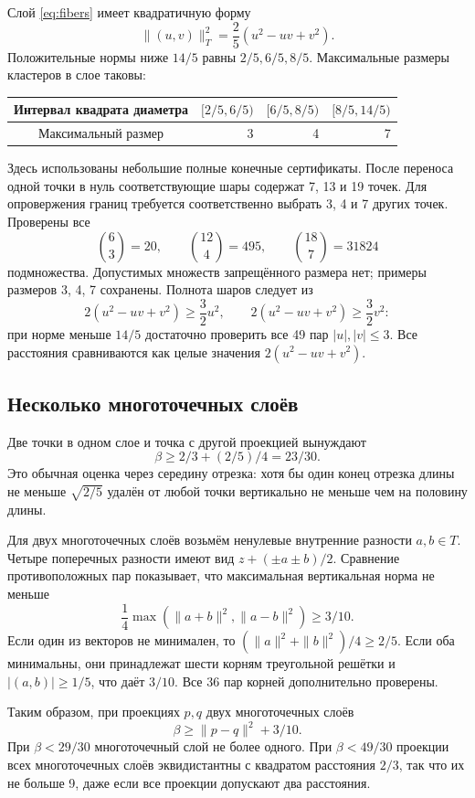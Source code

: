 \documentclass[11pt,a4paper]{article}
\theoremstyle{remark}\newtheorem{remark}[theorem]{Замечание}
\begin{document}
Слой \eqref{eq:fibers} имеет квадратичную форму
\[
\| (u,v)\|_T^2=\frac25(u^2-uv+v^2).
\]
Положительные нормы ниже $14/5$ равны $2/5,6/5,8/5$. Максимальные размеры кластеров в слое таковы:
\begin{center}
\begin{tabular}{crrr}
\toprule
Интервал квадрата диаметра &$[2/5,6/5)$&$[6/5,8/5)$&$[8/5,14/5)$\\\midrule
Максимальный размер &3&4&7\\
\bottomrule
\end{tabular}
\end{center}
Здесь использованы небольшие полные конечные сертификаты. После переноса одной точки в нуль соответствующие шары содержат 7, 13 и 19 точек. Для опровержения границ требуется соответственно выбрать 3, 4 и 7 других точек. Проверены все
\[
\binom63=20,\qquad \binom{12}4=495,\qquad \binom{18}7=31824
\]
подмножества. Допустимых множеств запрещённого размера нет; примеры размеров 3, 4, 7 сохранены. Полнота шаров следует из
\[
2(u^2-uv+v^2)\ge\frac32u^2,\qquad
2(u^2-uv+v^2)\ge\frac32v^2:
\]
при норме меньше $14/5$ достаточно проверить все 49 пар $|u|,|v|\le3$. Все расстояния сравниваются как целые значения $2(u^2-uv+v^2)$.

\subsection{Несколько многоточечных слоёв}

Две точки в одном слое и точка с другой проекцией вынуждают
\[
\beta\ge2/3+(2/5)/4=23/30.
\]
Это обычная оценка через середину отрезка: хотя бы один конец отрезка длины не меньше $\sqrt{2/5}$ удалён от любой точки вертикально не меньше чем на половину длины.

Для двух многоточечных слоёв возьмём ненулевые внутренние разности $a,b\in T$. Четыре поперечных разности имеют вид $z+(\pm a\pm b)/2$. Сравнение противоположных пар показывает, что максимальная вертикальная норма не меньше
\[
\frac14\max(\|a+b\|^2,\|a-b\|^2)\ge3/10.
\]
Если один из векторов не минимален, то $(\|a\|^2+\|b\|^2)/4\ge2/5$. Если оба минимальны, они принадлежат шести корням треугольной решётки и $|(a,b)|\ge1/5$, что даёт $3/10$. Все 36 пар корней дополнительно проверены.

Таким образом, при проекциях $p,q$ двух многоточечных слоёв
\begin{equation}\label{eq:twoheavy10}
\beta\ge\|p-q\|^2+3/10.
\end{equation}
При $\beta<29/30$ многоточечный слой не более одного. При $\beta<49/30$ проекции всех многоточечных слоёв эквидистантны с квадратом расстояния $2/3$, так что их не больше 9, даже если все проекции допускают два расстояния.
\end{document}
